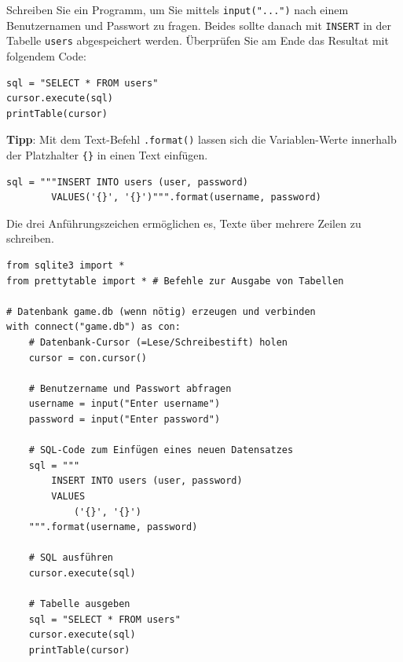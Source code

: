 \begin{myexercise}
    Schreiben Sie ein Programm, um Sie mittels \lstinline|input("...")| nach einem Benutzernamen und Passwort zu fragen. Beides sollte danach mit \lstinline[style=sql]|INSERT| in der Tabelle \texttt{users} abgespeichert werden. Überprüfen Sie am Ende das Resultat mit folgendem Code:
    \begin{lstlisting}
sql = "SELECT * FROM users"
cursor.execute(sql)
printTable(cursor)
\end{lstlisting}
    \textbf{Tipp}: Mit dem Text-Befehl \lstinline|.format()| lassen sich die Variablen-Werte innerhalb der Platzhalter \lstinline|{}| in einen Text einfügen.

    \begin{lstlisting}
sql = """INSERT INTO users (user, password)
        VALUES('{}', '{}')""".format(username, password)
\end{lstlisting}
    Die drei Anführungszeichen ermöglichen es, Texte über mehrere Zeilen zu schreiben.
    \begin{myanswer}
        \begin{lstlisting}
from sqlite3 import *
from prettytable import * # Befehle zur Ausgabe von Tabellen

# Datenbank game.db (wenn nötig) erzeugen und verbinden
with connect("game.db") as con:
    # Datenbank-Cursor (=Lese/Schreibestift) holen
    cursor = con.cursor()

    # Benutzername und Passwort abfragen
    username = input("Enter username")
    password = input("Enter password")

    # SQL-Code zum Einfügen eines neuen Datensatzes
    sql = """
        INSERT INTO users (user, password)
        VALUES
            ('{}', '{}')
    """.format(username, password)

    # SQL ausführen
    cursor.execute(sql)

    # Tabelle ausgeben
    sql = "SELECT * FROM users"
    cursor.execute(sql)
    printTable(cursor)

\end{lstlisting}
    \end{myanswer}
\end{myexercise}

